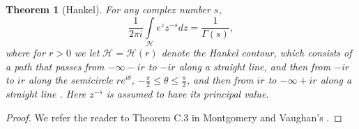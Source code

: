 \documentclass[12pt,reqno]{amsart}
\newtheorem{theorem}{Theorem}[section]
\begin{document}
\begin{theorem}[Hankel] \label{H}
    For any complex number $s$,
    \begin{equation*}
        \frac{1}{2\pi i} \int\limits_\mathcal{H} e^zz^{-s} dz= \frac{1}{\Gamma(s)},
    \end{equation*}
    where for $r>0$ we let $\mathcal{H}=\mathcal{H}(r)$ denote the Hankel contour, which consists  of a path that passes from $-\infty-ir$ to $-ir$ along a straight line, and then from $-ir$ to $ir$ along the semicircle $re^{i\theta}$, $-\frac{\pi}{2} \leq \theta \leq \frac{\pi}{2}$, and then from $ir$ to $- \infty +ir $ along a straight line . Here $z^{-s}$ is assumed to have its principal value.
\end{theorem}

\begin{proof}
    We refer the reader to Theorem C.3 in Montgomery and Vaughan's \cite{MV}.
\end{proof}
\end{document}
